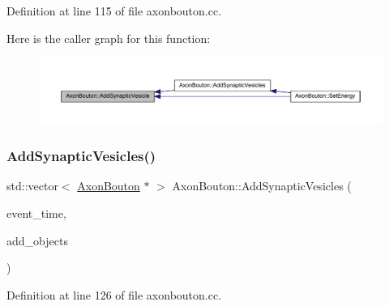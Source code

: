 Definition at line 115 of file axonbouton.\+cc.

Here is the caller graph for this function\+:\nopagebreak
\begin{figure}[H]
\begin{center}
\leavevmode
\includegraphics[width=350pt]{class_axon_bouton_a3009e5d49c699afa7f633b026b37ed77_icgraph}
\end{center}
\end{figure}
\mbox{\label{class_axon_bouton_a0e264da88f6ca5d77aa42f415cb4f3aa}} 
\subsubsection{\texorpdfstring{Add\+Synaptic\+Vesicles()}{AddSynapticVesicles()}}
{\footnotesize\ttfamily std\+::vector$<$ \hyperlink{class_axon_bouton}{Axon\+Bouton} $\ast$ $>$ Axon\+Bouton\+::\+Add\+Synaptic\+Vesicles (\begin{DoxyParamCaption}\item[{std\+::chrono\+::time\+\_\+point$<$ \hyperlink{universe_8h_a0ef8d951d1ca5ab3cfaf7ab4c7a6fd80}{Clock} $>$}]{event\+\_\+time,  }\item[{std\+::vector$<$ \hyperlink{class_axon_bouton}{Axon\+Bouton} $\ast$$>$}]{add\+\_\+objects }\end{DoxyParamCaption})}



Definition at line 126 of file axonbouton.\+cc.

